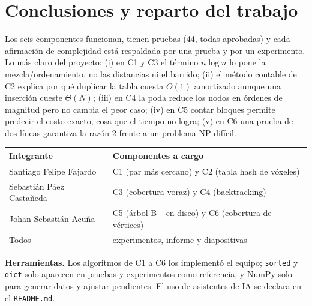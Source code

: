 \documentclass[11pt,letterpaper]{article}
\theoremstyle{plain}
\theoremstyle{definition}
\newcommand{\Th}{\Theta}
\begin{document}
\section{Conclusiones y reparto del trabajo}

Los seis componentes funcionan, tienen pruebas (44, todas aprobadas) y cada afirmación de complejidad
está respaldada por una prueba y por un experimento. Lo más claro del proyecto: (i) en C1 y C3 el término
$n\log n$ lo pone la mezcla/ordenamiento, no las distancias ni el barrido; (ii) el método contable de C2
explica por qué duplicar la tabla cuesta $O(1)$ amortizado aunque una inserción cueste $\Th(N)$; (iii) en
C4 la poda reduce los nodos en órdenes de magnitud pero no cambia el peor caso; (iv) en C5 contar
bloques permite predecir el costo exacto, cosa que el tiempo no logra; (v) en C6 una prueba de dos líneas
garantiza la razón 2 frente a un problema NP-difícil.

\begin{table}[H]
\centering\small
\begin{tabular}{ll}
\toprule
Integrante & Componentes a cargo \\
\midrule
Santiago Felipe Fajardo & C1 (par más cercano) y C2 (tabla hash de vóxeles) \\
Sebastián Páez Castañeda & C3 (cobertura voraz) y C4 (backtracking) \\
Johan Sebastián Acuña & C5 (árbol B+ en disco) y C6 (cobertura de vértices) \\
Todos & experimentos, informe y diapositivas \\
\bottomrule
\end{tabular}
\end{table}

\textbf{Herramientas.} Los algoritmos de C1 a C6 los implementó el equipo; \texttt{sorted}
y \texttt{dict} solo aparecen en pruebas y experimentos como referencia, y NumPy solo para generar datos y
ajustar pendientes. El uso de asistentes de IA se declara en el \texttt{README.md}.

\end{document}
